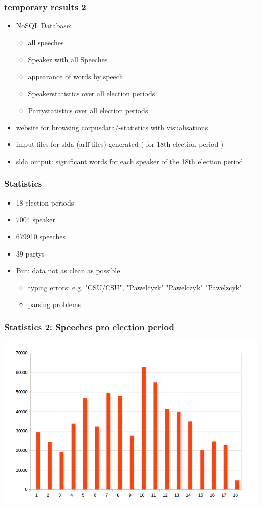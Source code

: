 \documentclass[11pt, a4paper]{beamer}
\begin{document}
\begin{frame}
\frametitle{temporary results 2}
\begin{itemize}
\item NoSQL Database:
	\begin{itemize}
		\item all speeches
		\item Speaker with all Speeches
		\item appearance of words by speech
		\item Speakerstatistics over all election periods
		\item Partystatistics over all election periods
	\end{itemize}
\item website for browsing corpusdata/-statistics with visualisations
\item imput files for slda (arff-files) generated ( for 18th election period )
\item slda output: significant words for each speaker of the 18th election period 
\end{itemize}
\end{frame}

\begin{frame}
\frametitle{Statistics}
\begin{itemize}
\item 18 election periods
\item 7004 speaker
\item 679910 speeches
\item 39 partys
\item But: data not as clean as possible
\begin{itemize}
\item typing errors: e.g. "CSU/CSU", "Pawelcyzk" "Pawelczyk" "Pawelzcyk"
\item parsing problems
\end{itemize}
\end{itemize}
\end{frame}

\begin{frame}
\frametitle{Statistics 2: Speeches pro election period}
\includegraphics[scale=0.4]{speechperperiod.png}
\end{frame}
\end{document}
